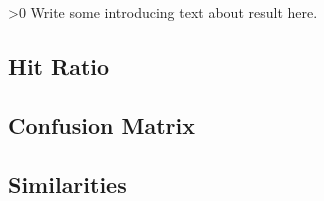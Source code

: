 \ifnum\printdraft>0
	Write some introducing text about result here.
\fi

\onecolumn
\subsection{Hit Ratio}

\subsection{Confusion Matrix}

\twocolumn
\subsection{Similarities}
